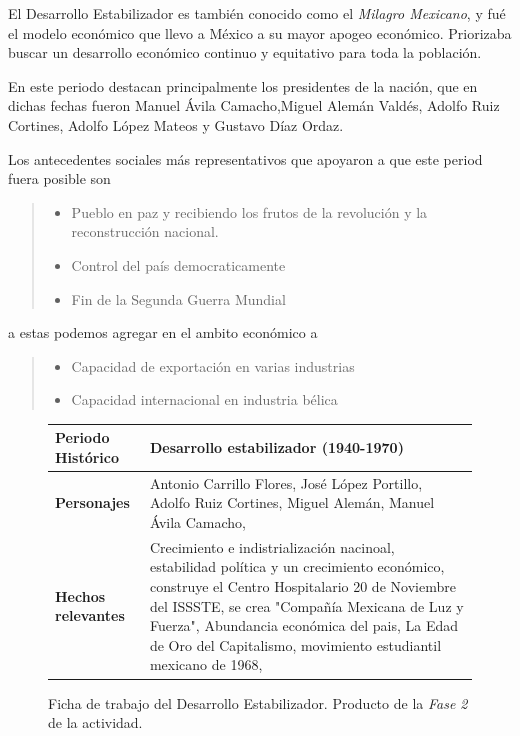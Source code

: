 \documentclass[12pt]{article}
\begin{document}
		\par El Desarrollo Estabilizador es tambi\'en conocido como el \textit{Milagro Mexicano}, y fu\'e el modelo econ\'omico que llevo a M\'exico a su mayor apogeo econ\'omico. Priorizaba buscar un desarrollo econ\'omico continuo y equitativo para toda la poblaci\'on.
		\par En este periodo destacan principalmente los presidentes de la naci\'on, que en dichas fechas fueron Manuel Ávila Camacho,Miguel Alemán Valdés, Adolfo Ruiz Cortines, Adolfo López Mateos y Gustavo Díaz Ordaz.
		\par Los antecedentes sociales m\'as representativos que apoyaron a que este period fuera posible son
		\begin{quote}\begin{itemize}
			\item Pueblo en paz y recibiendo los frutos de la revoluci\'on y la reconstrucci\'on nacional.
			\item Control del pa\'is democraticamente
			\item Fin de la Segunda Guerra Mundial
		\end{itemize}\end{quote}
		a estas podemos agregar en el ambito econ\'omico a
		
		\begin{quote} \begin{itemize}
			\item Capacidad de exportaci\'on en varias industrias
			\item Capacidad internacional en industria b\'elica
		\end{itemize}\end{quote}
	
\begin{figure}
	\centering
	
	\begin{tabular}{|b{3cm}||b{10cm}|}
		\hline
			\bf Periodo Hist\'orico &
			Desarrollo estabilizador (1940-1970) \\
		\hline
			\bf Personajes&
			Antonio Carrillo Flores, José López Portillo, Adolfo Ruiz Cortines, Miguel Alemán, Manuel Ávila Camacho, \\
		\hline
			\bf Hechos relevantes & 
			Crecimiento e indistrialización nacinoal, estabilidad política y un crecimiento económico, construye el Centro Hospitalario 20 de Noviembre del ISSSTE, se crea "Compañía Mexicana de Luz y Fuerza", Abundancia económica del pais, La Edad de Oro del Capitalismo, movimiento estudiantil mexicano de 1968, \\
		\hline
	\end{tabular}	
	\caption{Ficha de trabajo del Desarrollo Estabilizador. Producto de la \textit{Fase 2} de la actividad.}

\end{figure}
\end{document}
